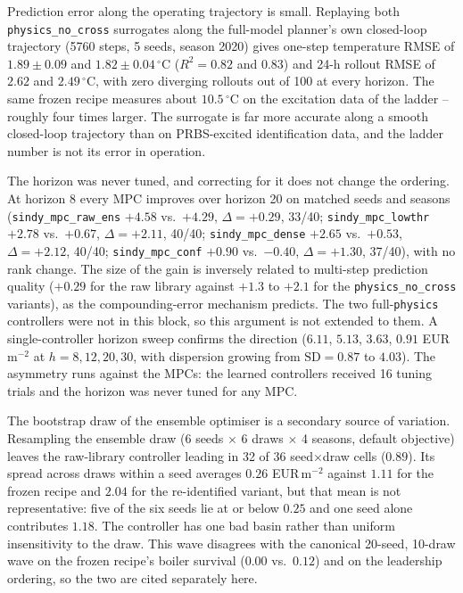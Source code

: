 Prediction error along the operating trajectory is small. Replaying both
\texttt{physics\_no\_cross}
surrogates along the full-model planner's own closed-loop trajectory (5760 steps, 5 seeds,
season 2020) gives one-step temperature RMSE of $1.89\pm0.09$ and $1.82\pm0.04\,^\circ$C
($R^2 = 0.82$ and $0.83$) and 24-h rollout RMSE of $2.62$ and $2.49\,^\circ$C, with zero
diverging rollouts out of 100 at every horizon. The same frozen recipe measures about
$10.5\,^\circ$C on the excitation data of the ladder -- roughly four times larger. The
surrogate is far more accurate along a smooth closed-loop trajectory than on PRBS-excited
identification data, and the ladder number is not its error in operation.

The horizon was never tuned, and correcting for it does not change the ordering.
At horizon 8 every MPC improves over horizon 20 on matched seeds and seasons
(\texttt{sindy\_mpc\_raw\_ens} $+4.58$ vs.\ $+4.29$, $\Delta=+0.29$, 33/40;
\texttt{sindy\_mpc\_lowthr} $+2.78$ vs.\ $+0.67$, $\Delta=+2.11$, 40/40;
\texttt{sindy\_mpc\_dense} $+2.65$ vs.\ $+0.53$, $\Delta=+2.12$, 40/40;
\texttt{sindy\_mpc\_conf} $+0.90$ vs.\ $-0.40$, $\Delta=+1.30$, 37/40), with no rank
change. The size of the gain is inversely related to multi-step prediction quality ($+0.29$
for the raw library against $+1.3$ to $+2.1$ for the \texttt{physics\_no\_cross} variants),
as the compounding-error mechanism predicts. The two full-\texttt{physics}
controllers were not in this block, so this argument is not extended to them. A single-controller horizon sweep confirms the direction
($6.11$, $5.13$, $3.63$, $0.91$ EUR\,m$^{-2}$ at $h=8,12,20,30$, with dispersion growing
from $\text{SD}=0.87$ to $4.03$). The asymmetry runs against the MPCs: the learned
controllers received 16 tuning trials and the horizon was never tuned for any MPC.

The bootstrap draw of the ensemble optimiser is a secondary source of variation.
Resampling the ensemble draw (6 seeds $\times$ 6 draws $\times$ 4 seasons, default
objective) leaves the raw-library controller leading in 32 of 36 seed$\times$draw cells
($0.89$). Its spread across draws within a seed averages $0.26$ EUR\,m$^{-2}$ against
$1.11$ for the frozen recipe and $2.04$ for the re-identified variant, but that mean is
not representative: five of the six seeds lie at or below $0.25$ and one seed alone
contributes $1.18$. The controller has one bad basin rather than uniform insensitivity to
the draw. This wave disagrees with the canonical 20-seed, 10-draw wave on the frozen
recipe's boiler survival ($0.00$ vs.\ $0.12$) and on the leadership ordering, so the two
are cited separately here.

